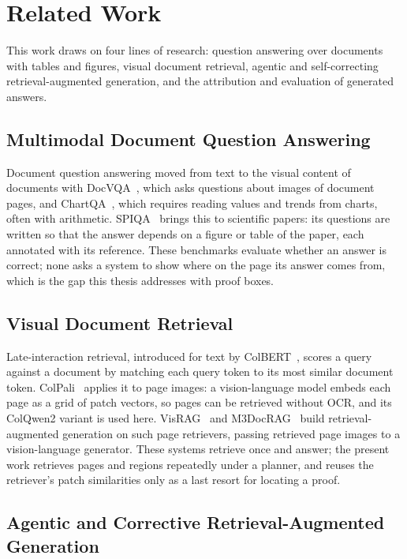 \chapter{Related Work}
\label{sec:related}

This work draws on four lines of research: question answering over documents with
tables and figures, visual document retrieval, agentic and self-correcting
retrieval-augmented generation, and the attribution and evaluation of generated
answers.

\section{Multimodal Document Question Answering}

Document question answering moved from text to the visual content of documents with
DocVQA~\cite{mathew2021docvqa}, which asks questions about images of document pages,
and ChartQA~\cite{masry2022chartqa}, which requires reading values and trends from
charts, often with arithmetic. SPIQA~\cite{pramanick2024spiqa} brings this to
scientific papers: its questions are written so that the answer depends on a figure
or table of the paper, each annotated with its reference. These benchmarks evaluate
whether an answer is correct; none asks a system to show where on the page its answer
comes from, which is the gap this thesis addresses with proof boxes.

\section{Visual Document Retrieval}

Late-interaction retrieval, introduced for text by ColBERT~\cite{khattab2020colbert},
scores a query against a document by matching each query token to its most similar
document token. ColPali~\cite{faysse2025colpali} applies it to page images: a
vision-language model embeds each page as a grid of patch vectors, so pages can be
retrieved without OCR, and its ColQwen2 variant is used here. VisRAG~\cite{yu2024visrag}
and M3DocRAG~\cite{cho2024m3docrag} build retrieval-augmented generation on such page
retrievers, passing retrieved page images to a vision-language generator. These
systems retrieve once and answer; the present work retrieves pages and regions
repeatedly under a planner, and reuses the retriever's patch similarities only as a
last resort for locating a proof.

\section{Agentic and Corrective Retrieval-Augmented Generation}


